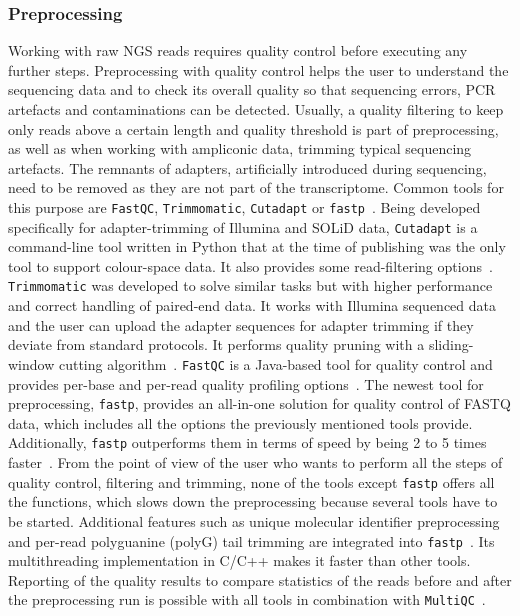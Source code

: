 \subsubsection*{Preprocessing}
Working with raw \ac{NGS} reads requires quality control before executing any further steps. Preprocessing with quality control helps the user to understand the sequencing data and to check its overall quality so that sequencing errors, \ac{PCR} artefacts and contaminations can be detected. Usually, a quality filtering to keep only reads above a certain length and quality threshold is part of preprocessing, as well as when working with ampliconic data, trimming typical sequencing artefacts. The remnants of adapters, artificially introduced during sequencing, need to be removed as they are not part of the transcriptome. Common tools for this purpose are \texttt{FastQC}, \texttt{Trimmomatic}, \texttt{Cutadapt} or \texttt{fastp}~\cite{andrews2010fastqc, bolger2014trimmomatic, martin2011cutadapt, chen2018fastp}. Being developed specifically for adapter-trimming of Illumina and SOLiD data, \texttt{Cutadapt} is a command-line tool written in Python that at the time of publishing was the only tool to support colour-space data. It also provides some read-filtering options~\cite{martin2011cutadapt}. \texttt{Trimmomatic} was developed to solve similar tasks but with higher performance and correct handling of paired-end data. It works with Illumina sequenced data and the user can upload the adapter sequences for adapter trimming if they deviate from standard protocols. It performs quality pruning with a sliding-window cutting algorithm~\cite{bolger2014trimmomatic}. \texttt{FastQC} is a Java-based tool for quality control and provides per-base and per-read quality profiling options~\cite{andrews2010fastqc}. The newest tool for preprocessing, \texttt{fastp}, provides an all-in-one solution for quality control of FASTQ data, which includes all the options the previously mentioned tools provide. Additionally, \texttt{fastp} outperforms them in terms of speed by being 2 to 5 times faster~\cite{chen2018fastp}. From the point of view of the user who wants to perform all the steps of quality control, filtering and trimming, none of the tools except \texttt{fastp} offers all the functions, which slows down the preprocessing because several tools have to be started. Additional features such as unique molecular identifier preprocessing and per-read polyguanine (polyG) tail trimming are integrated into \texttt{fastp}~\cite{chen2018fastp}. Its multithreading implementation in C/C++ makes it faster than other tools. Reporting of the quality results to compare statistics of the reads before and after the preprocessing run is possible with all tools in combination with \texttt{MultiQC}~\cite{ewels2016multiqc}.

